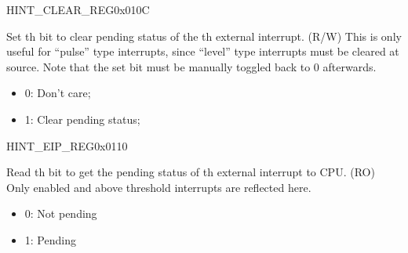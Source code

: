 \begin{register}{H}{INT\_CLEAR\_REG}{0x010C}\label{regdesc:INTCLEARREG}
%
%
%
%
%
%
\regnewline%
\begin{regdesc}
\begin{reglist}
\item [INT\_CLEAR\lbrack\regindex{n}\rbrack] Set th bit to clear pending status of the th external interrupt. (R/W) \newline This is only useful for “pulse” type interrupts, since “level” type interrupts must be cleared at source. \newline Note that the set bit must be manually toggled back to 0 afterwards.
\begin{itemize}
    \setlength\itemsep{-1em}
    \item 0: Don't care;
    \item 1: Clear pending status;
\end{itemize}
\end{reglist}
\end{regdesc}
\end{register}

\begin{register}{H}{INT\_EIP\_REG}{0x0110}\label{regdesc:INTEIPREG}
%
%
%
%
%
%
\regnewline%
\begin{regdesc}
\begin{reglist}
\item [INT\_EIP\lbrack\regindex{n}\rbrack] Read th bit to get the pending status of th external interrupt to CPU. (RO) \newline Only enabled and above threshold interrupts are reflected here.
\begin{itemize}
    \setlength\itemsep{-1em}
    \item 0: Not pending
    \item 1: Pending
\end{itemize}
\end{reglist}
\end{regdesc}
\end{register}

